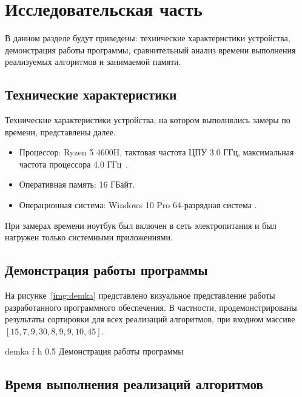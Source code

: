 \chapter{Исследовательская часть}

В данном разделе будут приведены: технические характеристики устройства, демонстрация работы программы, сравнительный анализ времени выполнения реализуемых алгоритмов и занимаемой памяти.

\section{Технические характеристики}

Технические характеристики устройства, на котором выполнялись замеры по времени, представлены далее.

\begin{itemize}
	\item Процессор: Ryzen 5 4600H, тактовая частота ЦПУ 3.0 ГГц, максимальная частота процессора 4.0 ГГц~\cite{ryzen}.
	\item Оперативная память: 16 ГБайт.
	\item Операционная система: Windows 10 Pro 64-разрядная система \cite{windows}.
\end{itemize}

При замерах времени ноутбук был включен в сеть электропитания и был нагружен только системными приложениями.

\section{Демонстрация работы программы}

На рисунке~\ref{img:demka} представлено визуальное представление работы разработанного программного обеспечения. В частности, продемонстрированы результаты сортировки для всех реализаций алгоритмов, при входном массиве $[15, 7, 9, 30, 8, 9, 9, 10, 45]$.

	{demka} %
	{f} %
	{h} %
	{0.5\textwidth} %
	{Демонстрация работы программы} %

\section{Время выполнения реализаций алгоритмов}

